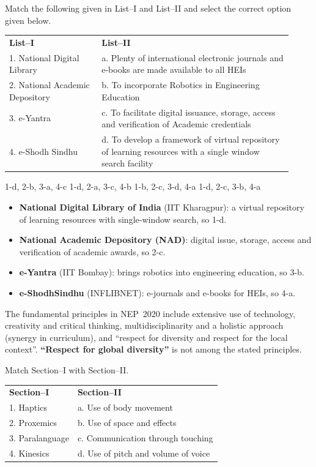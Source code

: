 Match the following given in List--I and List--II and select the correct option given below.\\[2pt]
\begin{tabular}{@{}p{0.3\linewidth}p{0.62\linewidth}@{}}
\textbf{List--I} & \textbf{List--II}\\
1. National Digital Library & a. Plenty of international electronic journals and e-books are made available to all HEIs\\
2. National Academic Depository & b. To incorporate Robotics in Engineering Education\\
3. e-Yantra & c. To facilitate digital issuance, storage, access and verification of Academic credentials\\
4. e-Shodh Sindhu & d. To develop a framework of virtual repository of learning resources with a single window search facility\\
\end{tabular}

1-d, 2-b, 3-a, 4-c
1-d, 2-a, 3-c, 4-b
1-b, 2-c, 3-d, 4-a
1-d, 2-c, 3-b, 4-a

\begin{itemize}
\item \textbf{National Digital Library of India} (IIT Kharagpur): a virtual repository of learning resources with single-window search, so 1-d.
\item \textbf{National Academic Depository (NAD)}: digital issue, storage, access and verification of academic awards, so 2-c.
\item \textbf{e-Yantra} (IIT Bombay): brings robotics into engineering education, so 3-b.
\item \textbf{e-ShodhSindhu} (INFLIBNET): e-journals and e-books for HEIs, so 4-a.
\end{itemize}

The fundamental principles in NEP~2020 include extensive use of technology, creativity and critical thinking, multidisciplinarity and a holistic approach (synergy in curriculum), and ``respect for diversity and respect for the local context''. \textbf{``Respect for global diversity''} is not among the stated principles.

Match Section--I with Section--II.\\[2pt]
\begin{tabular}{@{}ll@{}}
\textbf{Section--I} & \textbf{Section--II}\\
1. Haptics & a. Use of body movement\\
2. Proxemics & b. Use of space and effects\\
3. Paralanguage & c. Communication through touching\\
4. Kinesics & d. Use of pitch and volume of voice\\
\end{tabular}

